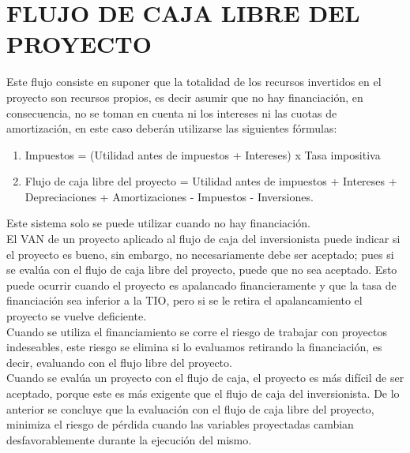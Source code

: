 \section{FLUJO DE CAJA LIBRE DEL PROYECTO}

Este flujo consiste en suponer que la totalidad de los recursos invertidos en el proyecto son recursos propios, es decir asumir que no hay financiación, en consecuencia, no se toman en cuenta ni los intereses ni las cuotas de amortización, en este caso deberán utilizarse las siguientes fórmulas:\\

\begin{enumerate}
	\item Impuestos = (Utilidad antes de impuestos + Intereses) x Tasa impositiva\\
	\item Flujo de caja libre del proyecto = Utilidad antes de impuestos + Intereses + Depreciaciones + Amortizaciones - Impuestos - Inversiones.
\end{enumerate}
Este sistema solo se puede utilizar cuando no hay financiación.\\

El VAN de un proyecto aplicado al flujo de caja del inversionista puede indicar si el proyecto es bueno, sin embargo, no necesariamente debe ser aceptado; pues si se evalúa con el flujo de caja libre del proyecto, puede que no sea aceptado. Esto puede ocurrir cuando el proyecto es apalancado financieramente y que la tasa de financiación sea inferior a la TIO, pero si se le retira el apalancamiento el proyecto se vuelve deficiente.\\

Cuando se utiliza el financiamiento se corre el riesgo de trabajar con proyectos indeseables, este riesgo se elimina si lo evaluamos retirando la financiación, es decir, evaluando con el flujo libre del proyecto.\\

Cuando se evalúa un proyecto con el flujo de caja, el proyecto es más difícil de ser aceptado, porque este es más exigente que el flujo de caja del inversionista. De lo anterior se concluye que la evaluación con el flujo de caja libre del proyecto, minimiza el riesgo de pérdida cuando las variables proyectadas cambian desfavorablemente durante la ejecución del mismo.\\\\
\\

